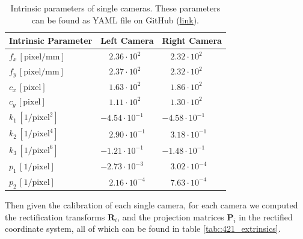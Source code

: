 \begin{table}
	\centering
	\caption{Intrinsic parameters of single cameras. These parameters can be found as YAML file on GitHub (\href{https://github.com/mhubii/nmpc_pattern_generator/tree/master/libs/io_module}{\underline{link}}).\label{tab::421_intrinsics}}
	\begin{tabular}{lll}
		Intrinsic Parameter & Left Camera & Right Camera\\
		\hline
		$f_x\,[\text{pixel}/\text{mm}]$ & $\quad2.36\cdot10^2$ & $\quad2.32\cdot10^2$ \\
		$f_y\,[\text{pixel}/\text{mm}]$ & $\quad2.37\cdot10^2$ & $\quad2.32\cdot10^2$ \\
		$c_x\,[\text{pixel}]$ & $\quad1.63\cdot10^2$ & $\quad1.86\cdot10^2$ \\
		$c_y\,[\text{pixel}]$ & $\quad1.11\cdot10^2$ & $\quad1.30\cdot10^2$ \\
		$k_1\,[1/\text{pixel}^2]$ & $-4.54\cdot10^{-1}$ & $-4.58\cdot10^{-1}$ \\
		$k_2\,[1/\text{pixel}^4]$ & $\quad2.90\cdot10^{-1}$  & $\quad3.18\cdot10^{-1}$  \\
		$k_3\,[1/\text{pixel}^6]$ & $-1.21\cdot10^{-1}$ & $-1.48\cdot10^{-1}$ \\
		$p_1\,[1/\text{pixel}]$ & $-2.73\cdot10^{-3}$ & $\quad3.02\cdot10^{-4}$  \\
		$p_2\,[1/\text{pixel}]$ & $\quad2.16\cdot10^{-4}$  & $\quad7.63\cdot10^{-4}$		
	\end{tabular}
\end{table}
Then given the calibration of each single camera, for each camera we computed the rectification transforms $\bm{R}_i$, and the projection matrices $\bm{P}_i$ in the rectified coordinate system, all of which can be found in table \ref{tab::421_extrinsics}.

